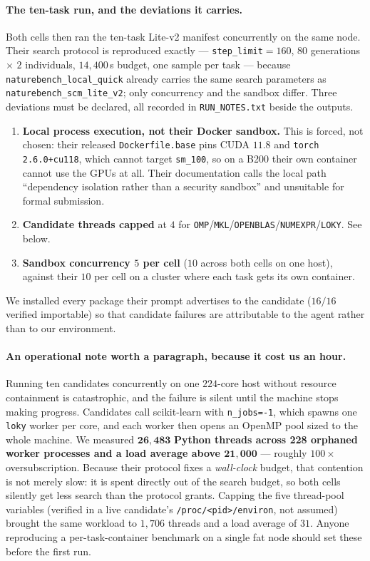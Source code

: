 \paragraph{The ten-task run, and the deviations it carries.}
Both cells then ran the ten-task Lite-v2 manifest concurrently on the same node. Their search
protocol is reproduced exactly --- \texttt{step\_limit}$=160$, $80$ generations $\times$ $2$
individuals, $14{,}400$\,s budget, one sample per task --- because
\texttt{naturebench\_local\_quick} already carries the same search parameters as
\texttt{naturebench\_scm\_lite\_v2}; only concurrency and the sandbox differ. Three deviations
must be declared, all recorded in \texttt{RUN\_NOTES.txt} beside the outputs.

\begin{enumerate}
\item \textbf{Local process execution, not their Docker sandbox.} This is forced, not chosen:
  their released \texttt{Dockerfile.base} pins CUDA $11.8$ and \texttt{torch 2.6.0+cu118},
  which cannot target \texttt{sm\_100}, so on a B200 their own container cannot use the GPUs
  at all. Their documentation calls the local path ``dependency isolation rather than a
  security sandbox'' and unsuitable for formal submission.
\item \textbf{Candidate threads capped} at $4$ for
  \texttt{OMP}/\texttt{MKL}/\texttt{OPENBLAS}/\texttt{NUMEXPR}/\texttt{LOKY}. See below.
\item \textbf{Sandbox concurrency $5$ per cell} ($10$ across both cells on one host), against
  their $10$ per cell on a cluster where each task gets its own container.
\end{enumerate}

We installed every package their prompt advertises to the candidate ($16/16$ verified
importable) so that candidate failures are attributable to the agent rather than to our
environment.

\paragraph{An operational note worth a paragraph, because it cost us an hour.}
Running ten candidates concurrently on one $224$-core host without resource containment is
catastrophic, and the failure is silent until the machine stops making progress. Candidates
call scikit-learn with \texttt{n\_jobs=-1}, which spawns one \texttt{loky} worker per core,
and each worker then opens an OpenMP pool sized to the whole machine. We measured
$\mathbf{26{,}483}$ \textbf{Python threads across 228 orphaned worker processes and a load
average above $\mathbf{21{,}000}$} --- roughly $100\times$ oversubscription. Because their
protocol fixes a \emph{wall-clock} budget, that contention is not merely slow: it is spent
directly out of the search budget, so both cells silently get less search than the protocol
grants. Capping the five thread-pool variables (verified in a live candidate's
\texttt{/proc/\textless pid\textgreater/environ}, not assumed) brought the same workload to
$1{,}706$ threads and a load average of $31$. Anyone reproducing a per-task-container
benchmark on a single fat node should set these before the first run.

